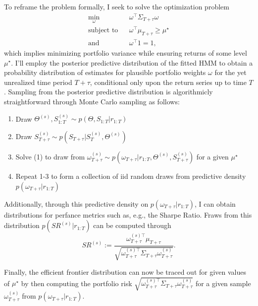 \documentclass[
]{article}
\providecommand{\tightlist}{%
  \setlength{\itemsep}{0pt}\setlength{\parskip}{0pt}}
\begin{document}
To reframe the problem formally, I seek to solve the optimization
problem \[
\begin{equation}
  \begin{align}
  \min_{\omega} & & \omega^\top\Sigma_{T+\tau}\omega \\
  \text{subject to} &  &\omega^\top\mu_{T+\tau}\geq\mu^{\star}\\
  \text{and} & & \omega^\top1  = 1,
  \end{align}
\end{equation}
\] which implies minimizing portfolio variance while ensuring returns of
some level \(\mu^\star\). I'll employ the posterior predictive
distribution of the fitted HMM to obtain a probability distribution of
estimates for plausible portfolio weights \(\omega\) for the yet
unrealized time period \(T+\tau\), conditional only upon the return
series up to time \(T\). Sampling from the posterior predictive
distribution is algorithmicly straightforward through Monte Carlo
sampling as follows:

\begin{enumerate}
\def\labelenumi{\arabic{enumi}.}
\tightlist
\item
  Draw \(\Theta^{(s)}, S_{1:T}^{(s)}\sim p(\Theta, S_{1:T}|r_{1:T})\)
\item
  Draw \(S_{T+\tau}^{(s)}\sim p(S_{T+\tau}|S_T^{(s)}, \Theta^{(s)})\)
\item
  Solve (1) to draw from
  \(\omega^{(s)}_{T+\tau}\sim p(\omega_{T+\tau}|r_{1:T},\Theta^{(s)}, S_{T+\tau}^{(s)})\)
  for a given \(\mu^\star\)
\item
  Repeat 1-3 to form a collection of iid random draws from predictive
  density \(p(\omega_{T+\tau}|r_{1:T})\)
\end{enumerate}

Additionally, through this predictive density on
\(p(\omega_{T+\tau}|r_{1:T})\), I can obtain distributions for perfance
metrics such as, e.g., the Sharpe Ratio. Fraws from this distribution
\(p(SR^{(s)}|r_{1:T})\) can be computed through \[
SR^{(s)}:=\frac{\omega_{T+\tau}^{(s)\top}\mu_{T+\tau}}{\sqrt{\omega_{T+\tau}^{(s)\top}\Sigma_{T+\tau}\omega_{T+\tau}^{(s)}}}.
\]

Finally, the efficient frontier distribution can now be traced out for
given values of \(\mu^\star\) by then computing the portfolio risk
\(\sqrt{\omega_{T+\tau}^{(s)\top}\Sigma_{T+\tau}\omega_{T+\tau}^{(s)}}\)
for a given sample \(\omega_{T+\tau}^{(s)}\) from
\(p(\omega_{T+\tau}|r_{1:T})\).
\end{document}
